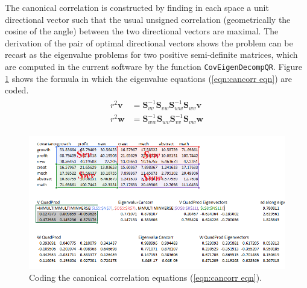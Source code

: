 \documentclass[article]{jss}
\numberwithin{equation}{subsection}
\begin{document}
        The canonical correlation is constructed by finding in each space a unit directional vector such that the usual unsigned correlation (geometrically the cosine of the angle) between the two directional vectors are maximal. The derivation of the pair of optimal directional vectors shows the problem can be recast as the eigenvalue problems for two positive semi-definite matrices, which are computed in the current software by the  function \texttt{CovEigenDecompQR}. Figure \ref{fig:Cancorr quadprod} shows the formula in which the eigenvalue equations (\ref{eqn:cancorr eqn}) are coded.
        \begin{align}\label{eqn:cancorr eqn}
        \begin{split}
        r^2\textbf{v}  &= \textbf{S}_{vv}^{ - 1}{\textbf{S}_{vw}}\textbf{S}_{ww}^{ - 1}{\textbf{S}_{wv}}\textbf{v} \\
        r^2\textbf{w} &= \textbf{S}_{ww}^{ - 1}{\textbf{S}_{wv}}\textbf{S}_{vv}^{ - 1}{\textbf{S}_{vw}}\textbf{w}
        \end{split}
        \end{align}
        \begin{figure}[!tbh]
          \vspace{-20pt}\includegraphics[width=\linewidth, keepaspectratio=true]{CanCorrSheetExplain_png}
          \vspace{-20pt}\centering{}\protect\caption{Coding the canonical correlation equations (\ref{eqn:cancorr eqn}).}\label{fig:Cancorr quadprod}
        \end{figure}
        
\end{document}
